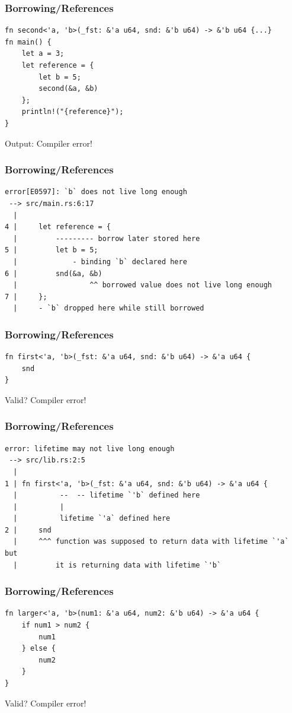 \begin{frame}[fragile]
    \frametitle{Borrowing/References}
    \begin{verbatim}
fn second<'a, 'b>(_fst: &'a u64, snd: &'b u64) -> &'b u64 {...}
fn main() {
    let a = 3;
    let reference = {
        let b = 5;
        second(&a, &b)
    };
    println!("{reference}");
}
    \end{verbatim}
    \vfill
    Output:
    \pause
    Compiler error!
\end{frame}

\begin{frame}[fragile]
    \frametitle{Borrowing/References}
    \begin{verbatim}
error[E0597]: `b` does not live long enough
 --> src/main.rs:6:17
  |
4 |     let reference = {
  |         --------- borrow later stored here
5 |         let b = 5;
  |             - binding `b` declared here
6 |         snd(&a, &b)
  |                 ^^ borrowed value does not live long enough
7 |     };
  |     - `b` dropped here while still borrowed
    \end{verbatim}
\end{frame}

\begin{frame}[fragile]
    \frametitle{Borrowing/References}
    \begin{verbatim}
fn first<'a, 'b>(_fst: &'a u64, snd: &'b u64) -> &'a u64 {
    snd
}
    \end{verbatim}
    \vfill
    Valid?
    \pause
    Compiler error!
\end{frame}

\begin{frame}[fragile]
    \frametitle{Borrowing/References}
    \begin{verbatim}
error: lifetime may not live long enough
 --> src/lib.rs:2:5
  |
1 | fn first<'a, 'b>(_fst: &'a u64, snd: &'b u64) -> &'a u64 {
  |          --  -- lifetime `'b` defined here
  |          |
  |          lifetime `'a` defined here
2 |     snd
  |     ^^^ function was supposed to return data with lifetime `'a` but
  |         it is returning data with lifetime `'b`
    \end{verbatim}
\end{frame}

\begin{frame}[fragile]
    \frametitle{Borrowing/References}
    \begin{verbatim}
fn larger<'a, 'b>(num1: &'a u64, num2: &'b u64) -> &'a u64 {
    if num1 > num2 {
        num1
    } else {
        num2
    }
}
    \end{verbatim}
    \vfill
    Valid?
    \pause
    Compiler error!
\end{frame}

